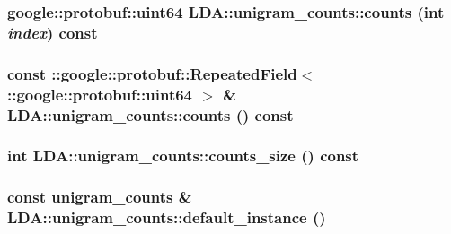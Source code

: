 \label{class_l_d_a_1_1unigram__counts_ad4dc1f88526f6873ebc0ba70d2a2c347}
\hypertarget{class_l_d_a_1_1unigram__counts_ae502d1a9da49765fa7a489335dce63f4}{
\subsubsection[{counts}]{\setlength{\rightskip}{0pt plus 5cm}google::protobuf::uint64 LDA::unigram\_\-counts::counts (int {\em index}) const}}
\label{class_l_d_a_1_1unigram__counts_ae502d1a9da49765fa7a489335dce63f4}
\hypertarget{class_l_d_a_1_1unigram__counts_a296cb84c517e9b258b9e5c38e18c8cca}{
\subsubsection[{counts}]{\setlength{\rightskip}{0pt plus 5cm}const ::google::protobuf::RepeatedField$<$::google::protobuf::uint64 $>$ \& LDA::unigram\_\-counts::counts () const}}
\label{class_l_d_a_1_1unigram__counts_a296cb84c517e9b258b9e5c38e18c8cca}
\hypertarget{class_l_d_a_1_1unigram__counts_ac97da7463b9dc3d5ed7c56f3542ebdc9}{
\subsubsection[{counts\_\-size}]{\setlength{\rightskip}{0pt plus 5cm}int LDA::unigram\_\-counts::counts\_\-size () const}}
\label{class_l_d_a_1_1unigram__counts_ac97da7463b9dc3d5ed7c56f3542ebdc9}
\hypertarget{class_l_d_a_1_1unigram__counts_ad503376383ee518e9782215334391e9c}{
\subsubsection[{default\_\-instance}]{\setlength{\rightskip}{0pt plus 5cm}const {\bf unigram\_\-counts} \& LDA::unigram\_\-counts::default\_\-instance ()}}
